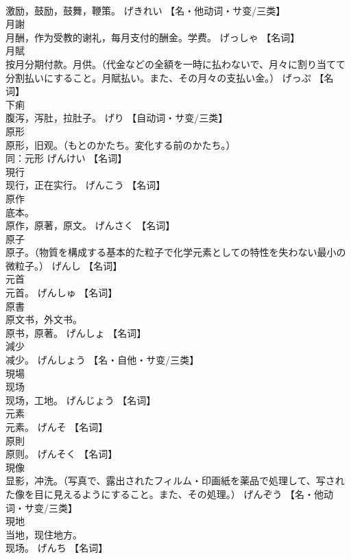 \documentclass[8pt]{extreport}
\begin{document}
\begin{CJK}{UTF8}{min}
\\	激励，鼓励，鼓舞，鞭策。	げきれい		【名・他动词・サ变/三类】
\\	月謝	
\\	月酬，作为受教的谢礼，每月支付的酬金。学费。	げっしゃ		【名词】
\\	月賦	
\\	按月分期付款。月供。（代金などの全額を一時に払わないで、月々に割り当てて分割払いにすること。月賦払い。また、その月々の支払い金。）	げっぷ		【名词】
\\	下痢	
\\	腹泻，泻肚，拉肚子。	げり		【自动词・サ变/三类】
\\	原形	
\\	原形，旧观。（もとのかたち。変化する前のかたち。） 
\\	同：元形	げんけい		【名词】
\\	現行	
\\	现行，正在实行。	げんこう		【名词】
\\	原作	
\\	底本。 
\\	原作，原著，原文。	げんさく		【名词】
\\	原子	
\\	原子。（物質を構成する基本的た粒子で化学元素としての特性を失わない最小の微粒子。）	げんし		【名词】
\\	元首	
\\	元首。	げんしゅ		【名词】
\\	原書	
\\	原文书，外文书。 
\\	原书，原著。	げんしょ		【名词】
\\	減少	
\\	减少。	げんしょう		【名・自他・サ变/三类】
\\	現場	
\\	现场 
\\	现场，工地。	げんじょう		【名词】
\\	元素	
\\	元素。	げんそ		【名词】
\\	原則	
\\	原则。	げんそく		【名词】
\\	現像	
\\	显影，冲洗。（写真で、露出されたフィルム・印画紙を薬品で処理して、写された像を目に見えるようにすること。また、その処理。）	げんぞう		【名・他动词・サ变/三类】
\\	現地	
\\	当地，现住地方。 
\\	现场。	げんち		【名词】

\end{CJK}
\end{document}
